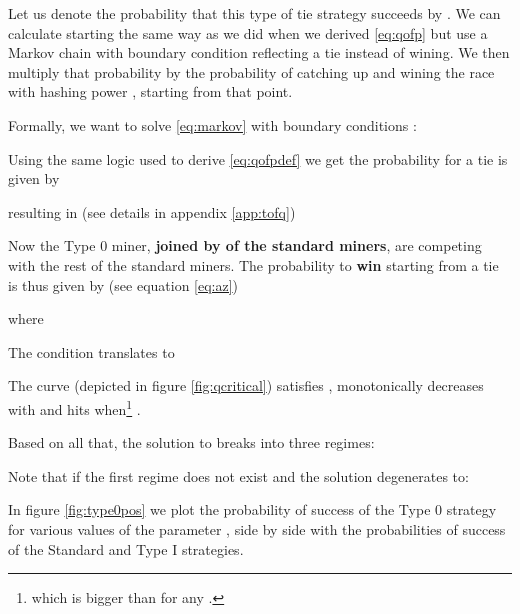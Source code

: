\documentclass[letterpaper,12pt]{report}
\begin{document}
Let us denote the probability that this type of tie strategy succeeds by .
We can calculate  starting the same way as we did when we derived \ref{eq:qofp} but use a Markov chain with boundary condition reflecting a tie instead of wining. We then multiply that probability by the probability of catching up and wining the race with hashing power , starting from that point.

Formally, we want to solve \ref{eq:markov} with boundary conditions :



Using the same logic used to derive \ref{eq:qofpdef} we get the probability for a tie is given by



resulting in (see details in appendix \ref{app:tofq})



Now the Type 0 miner, \textbf{joined by  of the standard miners}, are competing with the rest of the standard miners. The probability to \textbf{win} starting from a tie is thus given by (see equation \ref{eq:az}) 



where 


The condition  translates to 



The curve  (depicted in figure \ref{fig:qcritical}) satisfies , monotonically decreases with  and hits  when\footnote{ which is bigger than  for any .} .

Based on all that, the solution to  breaks into three regimes:



\noindent \begin{minipage}{\linewidth}
\label{fig:qcritical}
\end{minipage}
\linebreak

Note that if  the first regime does not exist and the solution degenerates to:



In figure \ref{fig:type0pos} we plot the probability of success of the Type 0 strategy  for various values of the parameter , side by side with the probabilities of success of the Standard and Type I strategies.

\noindent \begin{minipage}{\linewidth}
\label{fig:type0pos}
\end{minipage}
\linebreak
\end{document}
